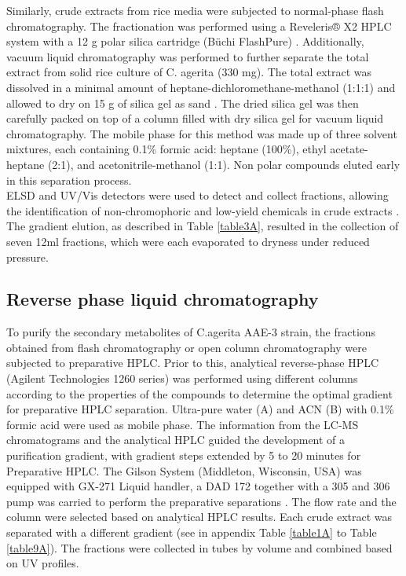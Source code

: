 Similarly, crude extracts from rice media were subjected to normal-phase flash chromatography. The fractionation was performed using a Reveleris® X2 HPLC system with a 12 g polar silica cartridge (Büchi FlashPure) \cite{Ellens}. Additionally, vacuum liquid chromatography was performed to further separate the total extract from solid rice culture of C. agerita (330 mg). The total extract was dissolved in a minimal amount of heptane-dichloromethane-methanol (1:1:1) and allowed to dry on 15 g of silica gel as sand . The dried silica gel was then carefully packed on top of a column filled with dry silica gel for vacuum liquid chromatography. The mobile phase for this method was made up of three solvent mixtures, each containing 0.1\% formic acid: heptane (100\%), ethyl acetate-heptane (2:1), and acetonitrile-methanol (1:1). Non polar compounds eluted early in this separation process.\\

ELSD and UV/Vis detectors were used to detect and collect fractions, allowing the identification of non-chromophoric and low-yield chemicals in crude extracts \cite{Ellens}. The gradient elution, as described in Table \ref{table3A}, resulted in the collection of seven 12ml fractions, which were each evaporated to dryness under reduced pressure.



\subsection{Reverse phase liquid chromatography}
To purify the secondary metabolites of C.agerita AAE-3 strain, the fractions obtained from flash chromatography or open column chromatography were subjected to preparative HPLC. Prior to this, analytical reverse-phase HPLC (Agilent Technologies 1260 series) was performed using different columns according to the properties of the compounds to determine the optimal gradient for preparative HPLC separation. Ultra-pure water (A) and ACN (B) with 0.1\% formic acid were used as mobile phase. The information from the LC-MS chromatograms and the analytical HPLC guided the development of a purification gradient, with gradient steps extended by 5 to 20 minutes for Preparative HPLC. The Gilson System (Middleton, Wisconsin, USA) was equipped with GX-271 Liquid handler, a DAD 172 together with a 305 and 306 pump was carried to perform the preparative separations \cite{Harms2021}. The flow rate and the column were selected based on analytical HPLC results. Each crude extract was separated with a different gradient (see in appendix Table \ref{table1A} to Table \ref{table9A}). The fractions were collected in tubes by volume and combined based on UV profiles.\\


